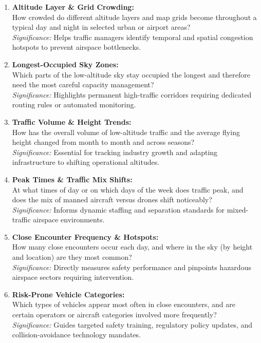 \documentclass[11pt,a4paper]{article}
\begin{document}
\begin{enumerate}
    \item \textbf{Altitude Layer \& Grid Crowding:} \\
    How crowded do different altitude layers and map grids become throughout a typical day and night in selected urban or airport areas? \\
    \textit{Significance:} Helps traffic managers identify temporal and spatial congestion hotspots to prevent airspace bottlenecks.

    \item \textbf{Longest-Occupied Sky Zones:} \\
    Which parts of the low-altitude sky stay occupied the longest and therefore need the most careful capacity management? \\
    \textit{Significance:} Highlights permanent high-traffic corridors requiring dedicated routing rules or automated monitoring.

    \item \textbf{Traffic Volume \& Height Trends:} \\
    How has the overall volume of low-altitude traffic and the average flying height changed from month to month and across seasons? \\
    \textit{Significance:} Essential for tracking industry growth and adapting infrastructure to shifting operational altitudes.

    \item \textbf{Peak Times \& Traffic Mix Shifts:} \\
    At what times of day or on which days of the week does traffic peak, and does the mix of manned aircraft versus drones shift noticeably? \\
    \textit{Significance:} Informs dynamic staffing and separation standards for mixed-traffic airspace environments.

    \item \textbf{Close Encounter Frequency \& Hotspots:} \\
    How many close encounters occur each day, and where in the sky (by height and location) are they most common? \\
    \textit{Significance:} Directly measures safety performance and pinpoints hazardous airspace sectors requiring intervention.

    \item \textbf{Risk-Prone Vehicle Categories:} \\
    Which types of vehicles appear most often in close encounters, and are certain operators or aircraft categories involved more frequently? \\
    \textit{Significance:} Guides targeted safety training, regulatory policy updates, and collision-avoidance technology mandates.


\end{enumerate}
\end{document}

